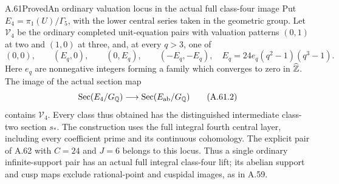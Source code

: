 \begin{statement}{A.61}{Proved}{An ordinary valuation locus in the actual full class-four image}
Put $E_4=\pi_1(U)/\Gamma_5$, with the lower central
series taken in the geometric group.  Let $\mathcal V_4$
be the ordinary completed unit-equation pairs with
valuation patterns $(0,1)$ at two and $(1,0)$ at three,
and, at every $q>3$, one of
\[
 (0,0),\qquad (E_q,0),\qquad(0,E_q),\qquad(-E_q,-E_q),
 \quad E_q=24e_q(q^2-1)(q^3-1).
 \tag{A.61.1}
\]
Here $e_q$ are nonnegative integers forming a family
which converges to zero in $\widehat{\mathbb Z}$.
The image of the actual section map
\[
       \operatorname{Sec}(E_4/G_\mathbb Q)
                 \longrightarrow\operatorname{Sec}(E_{\rm ab}/G_\mathbb Q)
 \tag{A.61.2}
\]
contains $\mathcal V_4$.  Every class thus obtained has
the distinguished intermediate class-two section $s_*$.
The construction uses the full integral fourth central
layer, including every coefficient prime and its
continuous cohomology.
The explicit pair of A.62 with $C=24$ and $J=6$ belongs
to this locus. Thus a single ordinary infinite-support pair
has an actual full integral class-four lift; its abelian
support and cusp maps exclude rational-point and cuspidal
images, as in A.59.
\end{statement}
